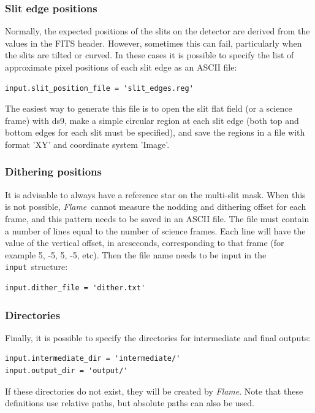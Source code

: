 \documentclass[a4paper]{article}
\newcommand{\flame}{\emph{Flame}}
\newcommand{\inp}{\texttt{input}}
\begin{document}
\begin{sloppypar}
\subsubsection{Slit edge positions}
Normally, the expected positions of the slits on the detector are derived from the values in the FITS header. However, sometimes this can fail, particularly when the slits are tilted or curved. In these cases it is possible to specify the list of approximate pixel positions of each slit edge as an ASCII file:
\begin{lstlisting}
input.slit_position_file = 'slit_edges.reg'
\end{lstlisting}
The easiest way to generate this file is to open the slit flat field (or a science frame) with ds9, make a simple circular region at each slit edge (both top and bottom edges for each slit must be specified), and save the regions in a file with format 'XY' and coordinate system 'Image'.



\subsubsection{Dithering positions}
\label{sec:manual_dithering}
It is advisable to always have a reference star on the multi-slit mask. When this is not possible, \flame\ cannot measure the nodding and dithering offset for each frame, and this pattern needs to be saved in an ASCII file. The file must contain a number of lines equal to the number of science frames. Each line will have the value of the vertical offset, in arcseconds, corresponding to that frame (for example 5, -5, 5, -5, etc). Then the file name needs to be input in the \inp\ structure:
\begin{lstlisting}
input.dither_file = 'dither.txt'
\end{lstlisting}

\subsubsection{Directories}
Finally, it is possible to specify the directories for intermediate and final outputs:
\begin{lstlisting}
input.intermediate_dir = 'intermediate/'
input.output_dir = 'output/'
\end{lstlisting}
If these directories do not exist, they will be created by \flame. Note that these definitions use relative paths, but absolute paths can also be used.




\end{sloppypar}
\end{document}
